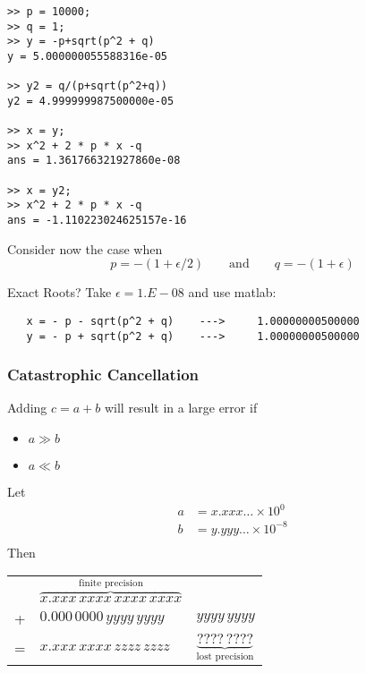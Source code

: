 \documentclass[10pt]{beamer}
\begin{document}
\begin{frame}[fragile]
\frametitle{}
\begin{lstlisting} 
>> p = 10000;
>> q = 1;
>> y = -p+sqrt(p^2 + q)
y = 5.000000055588316e-05

>> y2 = q/(p+sqrt(p^2+q))
y2 = 4.999999987500000e-05

>> x = y;
>> x^2 + 2 * p * x -q
ans = 1.361766321927860e-08

>> x = y2; 
>> x^2 + 2 * p * x -q
ans = -1.110223024625157e-16
\end{lstlisting} 

Consider now the case when 
\[ p = - (1 + \epsilon /2)   \qquad\text{and}\qquad  q = -(1+\epsilon)\]

Exact Roots?  Take $\epsilon = 1.E-08$ and use matlab:

\begin{lstlisting} 
   x = - p - sqrt(p^2 + q)    --->     1.00000000500000
   y = - p + sqrt(p^2 + q)    --->     1.00000000500000
\end{lstlisting}
\end{frame}
\begin{frame}
\frametitle{Catastrophic Cancellation}
Adding $c = a + b$ will result in a large error if
\begin{itemize}
  \item $a \gg b$
  \item $a \ll b$
\end{itemize}
Let
\begin{align*}
  a & = x.xxx\dots \times 10^0\\
  b & = y.yyy\dots \times 10^{-8}\\
\end{align*}
Then\qquad
\begin{tabular}{c l l}
& $\overbrace{x.xxx\,xxxx\,xxxx\,xxxx}^{\text{finite precision}}$& \\
+& $0.000\,0000\,yyyy\,yyyy$ & $yyyy\,yyyy$\\\hline
=& $x.xxx\,xxxx\,zzzz\,zzzz$ & $\underbrace{????\,????}_{\text{lost precision}}$\\
\end{tabular}
\end{frame}
\end{document}
